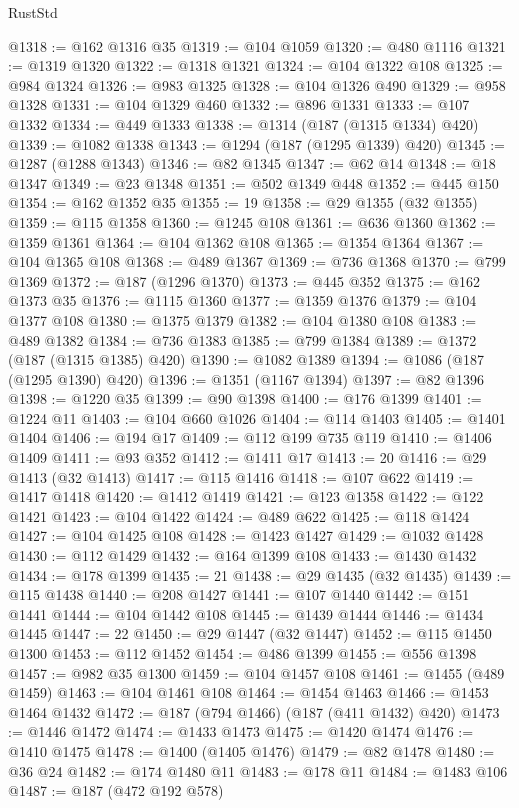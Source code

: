 \begin{lexlean}{RustStd}
\begin{coremodule}
{\begin{coremodule}
{{{{{{{{{{{{{{{{{{{{{{{{{{{{{{{{{{{{{{{{{{{{{{{{{{{{{{{@1318 := @162 @1316 @35
@1319 := @104 @1059
@1320 := @480 @1116
@1321 := @1319 @1320
@1322 := @1318 @1321
@1324 := @104 @1322 @108
@1325 := @984 @1324
@1326 := @983 @1325
@1328 := @104 @1326 @490
@1329 := @958 @1328
@1331 := @104 @1329 @460
@1332 := @896 @1331
@1333 := @107 @1332
@1334 := @449 @1333
@1338 := @1314 (@187 (@1315 @1334) @420)
@1339 := @1082 @1338
@1343 := @1294 (@187 (@1295 @1339) @420)
@1345 := @1287 (@1288 @1343)
@1346 := @82 @1345
@1347 := @62 @14
@1348 := @18 @1347
@1349 := @23 @1348
@1351 := @502 @1349 @448
@1352 := @445 @150
@1354 := @162 @1352 @35
@1355 := 19
@1358 := @29 @1355 (@32 @1355)
@1359 := @115 @1358
@1360 := @1245 @108
@1361 := @636 @1360
@1362 := @1359 @1361
@1364 := @104 @1362 @108
@1365 := @1354 @1364
@1367 := @104 @1365 @108
@1368 := @489 @1367
@1369 := @736 @1368
@1370 := @799 @1369
@1372 := @187 (@1296 @1370)
@1373 := @445 @352
@1375 := @162 @1373 @35
@1376 := @1115 @1360
@1377 := @1359 @1376
@1379 := @104 @1377 @108
@1380 := @1375 @1379
@1382 := @104 @1380 @108
@1383 := @489 @1382
@1384 := @736 @1383
@1385 := @799 @1384
@1389 := @1372 (@187 (@1315 @1385) @420)
@1390 := @1082 @1389
@1394 := @1086 (@187 (@1295 @1390) @420)
@1396 := @1351 (@1167 @1394)
@1397 := @82 @1396
@1398 := @1220 @35
@1399 := @90 @1398
@1400 := @176 @1399
@1401 := @1224 @11
@1403 := @104 @660 @1026
@1404 := @114 @1403
@1405 := @1401 @1404
@1406 := @194 @17
@1409 := @112 @199 @735 @119
@1410 := @1406 @1409
@1411 := @93 @352
@1412 := @1411 @17
@1413 := 20
@1416 := @29 @1413 (@32 @1413)
@1417 := @115 @1416
@1418 := @107 @622
@1419 := @1417 @1418
@1420 := @1412 @1419
@1421 := @123 @1358
@1422 := @122 @1421
@1423 := @104 @1422
@1424 := @489 @622
@1425 := @118 @1424
@1427 := @104 @1425 @108
@1428 := @1423 @1427
@1429 := @1032 @1428
@1430 := @112 @1429
@1432 := @164 @1399 @108
@1433 := @1430 @1432
@1434 := @178 @1399
@1435 := 21
@1438 := @29 @1435 (@32 @1435)
@1439 := @115 @1438
@1440 := @208 @1427
@1441 := @107 @1440
@1442 := @151 @1441
@1444 := @104 @1442 @108
@1445 := @1439 @1444
@1446 := @1434 @1445
@1447 := 22
@1450 := @29 @1447 (@32 @1447)
@1452 := @115 @1450 @1300
@1453 := @112 @1452
@1454 := @486 @1399
@1455 := @556 @1398
@1457 := @982 @35 @1300
@1459 := @104 @1457 @108
@1461 := @1455 (@489 @1459)
@1463 := @104 @1461 @108
@1464 := @1454 @1463
@1466 := @1453 @1464 @1432
@1472 := @187 (@794 @1466) (@187 (@411 @1432) @420)
@1473 := @1446 @1472
@1474 := @1433 @1473
@1475 := @1420 @1474
@1476 := @1410 @1475
@1478 := @1400 (@1405 @1476)
@1479 := @82 @1478
@1480 := @36 @24
@1482 := @174 @1480 @11
@1483 := @178 @11
@1484 := @1483 @106
@1487 := @187 (@472 @192 @578)
}}}}}}}}}}}}}}}}}}}}}}}}}}}}}}}}}}}}}}}}}}}}}}}}}}}}}}}
\end{coremodule}}
\end{coremodule}
\end{lexlean}

